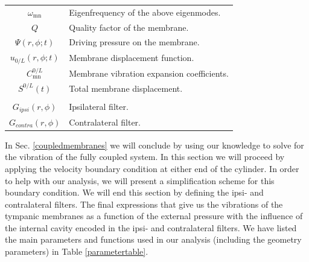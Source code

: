 \begin{minipage}{\linewidth}
\begin{tabular}{c p{12 cm}}
$\omega_{\mathrm{mn}}$ & Eigenfrequency of the above eigenmodes.\\
$Q$ & Quality factor of the membrane.\\
$\Psi(r,\phi;t)$ & Driving pressure on the membrane.\\
$u_{0/L}(r,\phi;t)$ & Membrane displacement function.\\
$C^{0/L}_{\mathrm{mn}}$ & Membrane vibration expansion coefficients.\\
$S^{0/L}(t)$ & Total membrane displacement.\\
&\\
$G_{ipsi}(r,\phi)$ & Ipsilateral filter.\\
$G_{contra}(r,\phi)$ & Contralateral filter.\\
\hline
\end {tabular}\par
\bigskip
\end{minipage}
In Sec. \ref{coupledmembranes} we will conclude by using our knowledge to solve for the vibration of the fully coupled
system. In this section we will  proceed by applying the velocity boundary condition at either end of the cylinder. In
order to help with our analysis, we will present a simplification scheme for this boundary condition. We will end this section
by defining the ipsi- and contralateral filters. The final expressions that give us the vibrations 
of the tympanic membranes as a function of the external pressure with the influence of the internal cavity encoded in the ipsi- and contralateral filters. 
We have listed the main parameters and functions used in our analysis (including the geometry parameters) in Table \ref{parametertable}.
